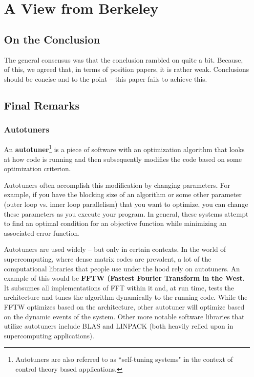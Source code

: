 



\section{A View from Berkeley}

\subsection{On the Conclusion}

The general consensus was that the conclusion rambled on quite a bit. Because, of this, we agreed that, in terms of position papers, it is rather weak. Conclusions should be concise and to the point -- this paper fails to achieve this. 

\subsection{Final Remarks}

\subsubsection{Autotuners}

An \textbf{autotuner}\footnote{Autotuners are also referred to as ``self-tuning systems" in the context of control theory based applications.} is a piece of software with an optimization algorithm that looks at how code is running and then subsequently modifies the code based on some optimization criterion.

Autotuners often accomplish this modification by changing parameters. For example, if you have the blocking size of an algorithm or some other parameter (outer loop vs. inner loop parallelism) that you want to optimize, you can change these parameters as you execute your program. In general, these systems attempt to find an optimal condition for an objective function while minimizing an associated error function.

Autotuners are used widely -- but only in certain contexts. In the world of supercomputing, where dense matrix codes are prevalent, a lot of the computational libraries that people use under the hood rely on autotuners. An example of this would be \textbf{FFTW (Fastest Fourier Transform in the West}. It subsumes all implementations of FFT within it and, at run time, tests the architecture and tunes the algorithm dynamically to the running code. While the FFTW optimizes based on the architecture, other autotuner will optimize based on the dynamic events of the system. Other more notable software libraries that utilize autotuners include BLAS and LINPACK (both heavily relied upon in supercomputing applications).

